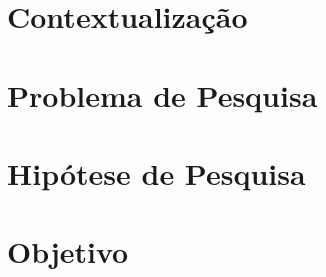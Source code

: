 
\section{Contextualização}

\section{Problema de Pesquisa}

\section{Hipótese de Pesquisa}

\section{Objetivo}